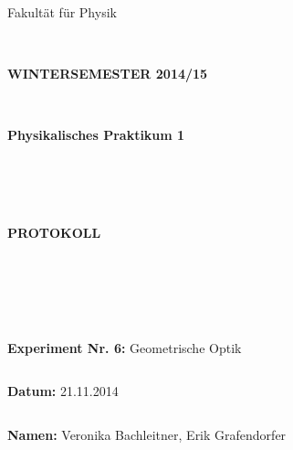 \documentclass{article}
\begin{document}
\thispagestyle{empty}
			\begin{center}
			\Large{Fakultät für Physik}\\
			\end{center}
\begin{verbatim}


\end{verbatim}
			\begin{center}
			\textbf{\LARGE WINTERSEMESTER 2014/15}
			\end{center}
\begin{verbatim}


\end{verbatim}
			\begin{center}
			\textbf{\LARGE{Physikalisches Praktikum 1}}
			\end{center}
\begin{verbatim}




\end{verbatim}

			\begin{center}
			\textbf{\LARGE{PROTOKOLL}}
			\end{center}
			
\begin{verbatim}





\end{verbatim}

			\begin{flushleft}
			\Large{\textbf{Experiment Nr. 6:} Geometrische Optik}\\
			\LARGE{}	
			\end{flushleft}

\begin{verbatim}

\end{verbatim}	
			\begin{flushleft}
			\textbf{\Large{Datum:}} \Large{21.11.2014}
			\end{flushleft}
			
\begin{verbatim}
\end{verbatim}
		\begin{flushleft}
			\textbf{\Large{Namen:}} \Large{Veronika Bachleitner, Erik Grafendorfer}
			\end{flushleft}
\end{document}

